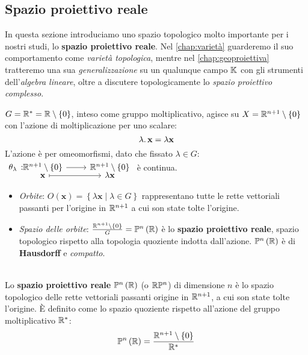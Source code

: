 \subsection{Spazio proiettivo reale}
In questa sezione introduciamo uno spazio topologico molto importante per i nostri studi, lo \textbf{spazio proiettivo reale}. Nel \autoref{chap:varietà} guarderemo il suo comportamento come \textit{varietà topologica}, mentre nel \autoref{chap:geoproiettiva} tratteremo una sua \textit{generalizzazione} su un qualunque campo $\mathbb{K}$ con gli strumenti dell'\textit{algebra lineare}, oltre a discutere topologicamente lo \textit{spazio proiettivo complesso}.
\begin{example}
	$G=\mathbb{R}^{\ast}=\mathbb{R}\setminus\left\{0\right\}$, inteso come gruppo moltiplicativo, agisce su $X=\mathbb{R}^{n+1}\setminus\left\{0\right\}$ con l'azione di moltiplicazione per uno scalare:
	\begin{equation}
		\lambda\ldotp \mathbf{x} = \lambda\mathbf{x}
	\end{equation}
L'azione è per omeomorfismi, dato che fissato $\lambda\in G$: $\funztot{\theta_\lambda}{\realset^{n+1}\setminus\left\{0\right\}}{\realset^{n+1}\setminus\left\{0\right\}}{\mathbf{x}}{\lambda \mathbf{x}}$ è continua.
\begin{itemize}
	\item \textit{Orbite}: $O\left(\mathbf{x}\right)=\left\{\lambda \mathbf{x}\mid \lambda\in G\right\}$ rappresentano tutte le rette vettoriali passanti per l'origine in $\mathbb{R}^{n+1}$ a cui son state tolte l'origine.
	\item \textit{Spazio delle orbite}: $\frac{\realset^{n+1}\setminus\left\{0\right\}}{G}=\proj[n]{\realset}$ è lo \textbf{spazio proiettivo reale}, spazio topologico rispetto alla topologia quoziente indotta dall'azione. $\proj[n]{\realset}$ è di \textbf{Hausdorff} e \textit{compatto}.
\end{itemize}
\vspace{-3mm}
\end{example}
\begin{define}~{}\label{def spazio proiettivo}\\
Lo \textbf{spazio proiettivo reale} $\proj[n]{\realset}$ (o $\realset\proj[n]{\ }$) di dimensione $n$ è lo spazio topologico delle rette vettoriali passanti origine in $\mathbb{R}^{n+1}$, a cui son state tolte l'origine. È definito come lo spazio quoziente rispetto all'azione del gruppo moltiplicativo $\mathbb{R}^{\ast}$:
	\begin{equation}
		\proj[n]{\realset}= \frac{\realset^{n+1}\setminus \left\{0\right\}}{\realset^{\ast}}
	\end{equation}
\vspace{-6mm}
\end{define}
